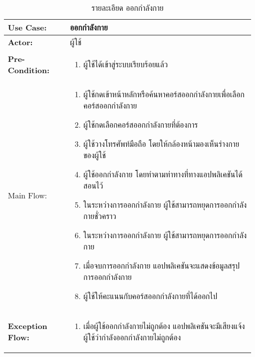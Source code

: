 \begin{table}
    \caption{รายละเอียด ออกกำลังกาย}
    \begin{tabularx}{\textwidth}{ | >{\centering\bf} p{3cm} | X |}
        \hline
        Use Case: & ออกกำลังกาย \\\hline
        Actor: & ผู้ใช้ \\\hline
        Pre-Condition: &
        \begin{enumerate}[table]
            \item ผู้ใช้ได้เข้าสู่ระบบเรียบร้อยแล้ว
        \end{enumerate} \\\hline
        
        Main Flow: & 
        \begin{enumerate}[table]
            \item ผู้ใช้กดเข้าหน้าหลักหรือค้นหาคอร์สออกกำลังกายเพื่อเลือกคอร์สออกกำลังกาย
            \item ผู้ใช้กดเลือกคอร์สออกกำลังกายที่ต้องการ
            \item ผู้ใช้วางโทรศัพท์มือถือ โดยให้กล้องหน้ามองเห็นร่างกายของผู้ใช้
            \item ผู้ใช้ออกกำลังกาย โดยทำตามท่าทางที่ทางแอปพลิเคชันได้สอนไว้
            \item ในระหว่างการออกกำลังกาย ผู้ใช้สามารถหยุดการออกกำลังกายชั่วคราว
            \item ในระหว่างการออกกำลังกาย ผู้ใช้สามารถหยุดการออกกำลังกาย
            \item เมื่อจบการออกกำลังกาย แอปพลิเคชันจะแสดงข้อมูลสรุปการออกกำลังกาย
            \item ผู้ใช้ให้คะแนนกับคอร์สออกกำลังกายที่ได้ออกไป
        \end{enumerate}\\\hline
        Exception Flow: & 
        \begin{enumerate}[table]
            \item เมื่อผู้ใช้ออกกำลังกายไม่ถูกต้อง แอปพลิเคชันจะมีเสียงแจ้งผู้ใช้ว่ากำลังออกกำลังกายไม่ถูกต้อง
        \end{enumerate}\\\hline
    \end{tabularx}
\end{table}


